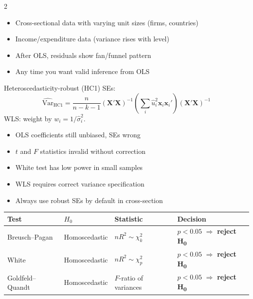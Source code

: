 \documentclass[10pt,a4paper]{article}
\newcommand{\reject}{$\Rightarrow$ \textbf{reject H\textsubscript{0}}}
\begin{document}
\begin{multicols}{2}

\begin{tcolorbox}[when]
\begin{itemize}
  \item Cross-sectional data with varying unit sizes (firms, countries)
  \item Income/expenditure data (variance rises with level)
  \item After OLS, residuals show fan/funnel pattern
  \item Any time you want valid inference from OLS
\end{itemize}
\end{tcolorbox}

\begin{tcolorbox}[key]
Heteroscedasticity-robust (HC1) SEs:
\[
\widehat{\text{Var}}_{\text{HC1}} = \frac{n}{n-k-1}(\mathbf{X}'\mathbf{X})^{-1}\!\left(\sum_i \hat{u}_i^2 \mathbf{x}_i\mathbf{x}_i'\right)\!(\mathbf{X}'\mathbf{X})^{-1}
\]
WLS: weight by $w_i = 1/\hat{\sigma}_i^2$.
\end{tcolorbox}

\columnbreak

\begin{tcolorbox}[watchout]
\begin{itemize}
  \item OLS coefficients still unbiased, SEs wrong
  \item $t$ and $F$ statistics invalid without correction
  \item White test has low power in small samples
  \item WLS requires correct variance specification
  \item Always use robust SEs by default in cross-section
\end{itemize}
\end{tcolorbox}

\end{multicols}

\begin{tcolorbox}[tests]
\begin{tabularx}{\linewidth}{lXll}
\toprule
\textbf{Test} & \textbf{$H_0$} & \textbf{Statistic} & \textbf{Decision} \\
\midrule
Breusch--Pagan & Homoscedastic & $nR^2 \sim \chi^2_k$ & $p < 0.05$ \reject \\
\rowcolor{RowGray}
White & Homoscedastic & $nR^2 \sim \chi^2_p$ & $p < 0.05$ \reject \\
Goldfeld--Quandt & Homoscedastic & $F$-ratio of variances & $p < 0.05$ \reject \\
\bottomrule
\end{tabularx}
\end{tcolorbox}
\end{document}
